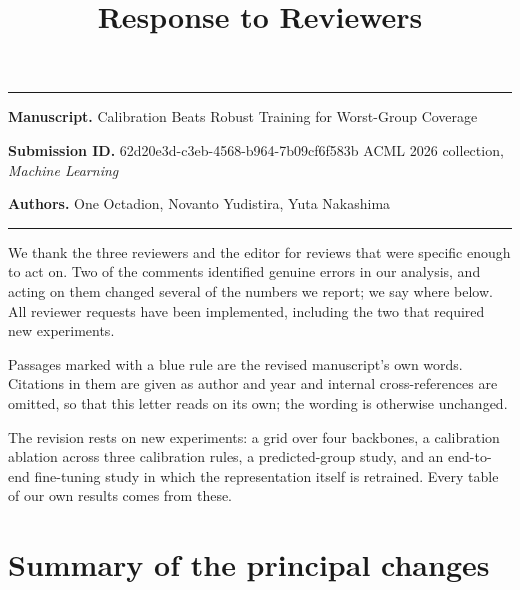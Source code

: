 \documentclass[11pt,a4paper]{article}
\title{\vspace{-1.6cm}\Large\bfseries Response to Reviewers}
\date{}
\author{}
\begin{document}
\maketitle
\vspace{-2.2cm}

\noindent\textcolor{rulegrey}{\rule{\textwidth}{1pt}}

\textbf{Manuscript.} Calibration Beats Robust Training for Worst-Group Coverage

\textbf{Submission ID.} 62d20e3d-c3eb-4568-b964-7b09cf6f583b \quad ACML 2026 collection,
\emph{Machine Learning}

\textbf{Authors.} One Octadion, Novanto Yudistira, Yuta Nakashima

\noindent\textcolor{rulegrey}{\rule{\textwidth}{1pt}}

We thank the three reviewers and the editor for reviews that were specific enough to act on. Two of
the comments identified genuine errors in our analysis, and acting on them changed several of the
numbers we report; we say where below. All
reviewer requests have been implemented, including the two that required new experiments.

Passages marked with a blue rule are the revised manuscript's own words. Citations in them are
given as author and year and internal cross-references are omitted, so that this letter reads on
its own; the wording is otherwise unchanged.

The revision rests on new experiments: a grid over four backbones, a calibration ablation across
three calibration rules, a predicted-group study, and an end-to-end fine-tuning study in which the
representation itself is retrained. Every table of our own results comes from these.

\section*{Summary of the principal changes}
\end{document}
